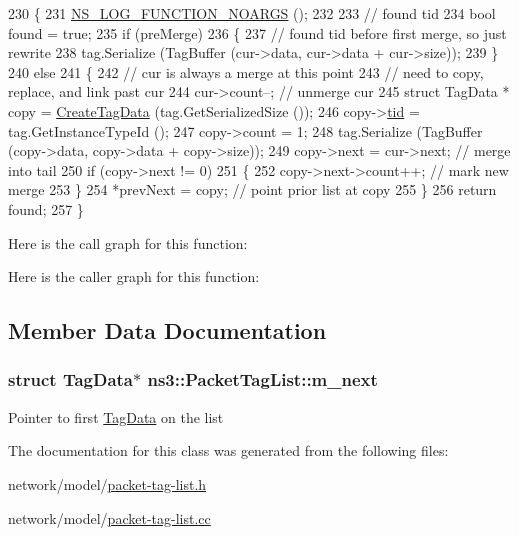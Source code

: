 \begin{DoxyCode}
230 \{
231   \hyperlink{log-macros-disabled_8h_a8f7e4afc291c9d29a65c18ac1f79197b}{NS\_LOG\_FUNCTION\_NOARGS} ();
232 
233   \textcolor{comment}{// found tid}
234   \textcolor{keywordtype}{bool} found = \textcolor{keyword}{true};
235   \textcolor{keywordflow}{if} (preMerge)
236     \{
237       \textcolor{comment}{// found tid before first merge, so just rewrite}
238       tag.Serialize (TagBuffer (cur->data, cur->data + cur->size));
239     \}
240   \textcolor{keywordflow}{else}
241     \{
242       \textcolor{comment}{// cur is always a merge at this point}
243       \textcolor{comment}{// need to copy, replace, and link past cur}
244       cur->count--;                     \textcolor{comment}{// unmerge cur}
245       \textcolor{keyword}{struct }TagData * copy = \hyperlink{classns3_1_1PacketTagList_abfab9cfb3a21336e2f7962cc51fcff94}{CreateTagData} (tag.GetSerializedSize ());
246       copy->\hyperlink{structns3_1_1PacketTagList_1_1TagData_a5086e334de32e4eee36059907e5d2197}{tid} = tag.GetInstanceTypeId ();
247       copy->count = 1;
248       tag.Serialize (TagBuffer (copy->data, copy->data + copy->size));
249       copy->next = cur->next;           \textcolor{comment}{// merge into tail}
250       \textcolor{keywordflow}{if} (copy->next != 0)
251         \{
252           copy->next->count++;          \textcolor{comment}{// mark new merge}
253         \}
254       *prevNext = copy;                 \textcolor{comment}{// point prior list at copy}
255     \}
256   \textcolor{keywordflow}{return} found;
257 \}
\end{DoxyCode}


Here is the call graph for this function\+:




Here is the caller graph for this function\+:




\subsection{Member Data Documentation}
\subsubsection[{\texorpdfstring{m\+\_\+next}{m_next}}]{\setlength{\rightskip}{0pt plus 5cm}struct {\bf Tag\+Data}$\ast$ ns3\+::\+Packet\+Tag\+List\+::m\+\_\+next\hspace{0.3cm}{\ttfamily [private]}}\hypertarget{classns3_1_1PacketTagList_a69e3eca2ef2793ab142ecd2b2ede4ead}{}\label{classns3_1_1PacketTagList_a69e3eca2ef2793ab142ecd2b2ede4ead}
Pointer to first \hyperlink{structns3_1_1PacketTagList_1_1TagData}{Tag\+Data} on the list 

The documentation for this class was generated from the following files\+:\begin{DoxyCompactItemize}
\item 
network/model/\hyperlink{packet-tag-list_8h}{packet-\/tag-\/list.\+h}\item 
network/model/\hyperlink{packet-tag-list_8cc}{packet-\/tag-\/list.\+cc}\end{DoxyCompactItemize}
